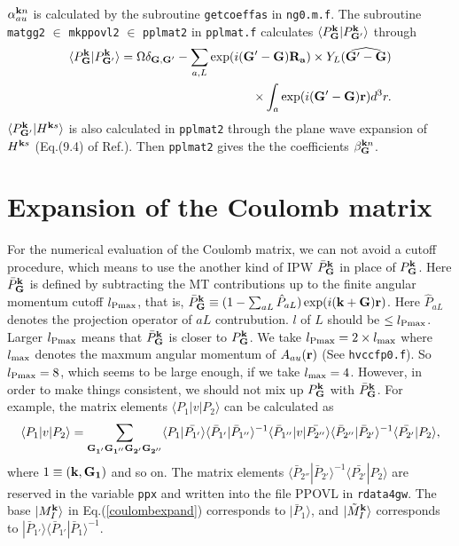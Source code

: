 \documentclass[a4paper,10pt,epsf,fleqn]{article}
\begin{document}
{\noindent $\alpha^{{\bf k} n}_{au}$ is calculated by the subroutine {\tt getcoeffas} in 
{\tt ng0.m.f}.
The subroutine {\tt matgg2} $\in$ {\tt mkppovl2} $\in$ {\tt pplmat2} in {\tt pplmat.f} calculates
$\langle P^{\bf k}_{\bf G}|P^{\bf k}_{{\bf G}'} \rangle$ through
\begin{eqnarray}
\langle P^{\bf k}_{\bf G}|P^{\bf k}_{{\bf G}'} \rangle
= \Omega \delta_{{\bf G},{\bf G}'} -  
\sum_{a,L} \exp( i ({\bf G}'-{\bf G}) {\bf R_a}) 
\times Y_L(\widehat{{\bf G}'-{\bf G}}) \nonumber \\
\times \int_{a} \exp(i({\bf G}'-{\bf G}){\bf r}) d^3r.
\end{eqnarray}
$\langle P^{\bf k}_{{\bf G}'}| H^{{\bf k}s} \rangle$ is also calculated
in {\tt pplmat2} through the plane wave expansion of $H^{{\bf k}s}$
(Eq.(9.4) of Ref.\cite{bott98}). Then {\tt pplmat2} gives the
the coefficients $\beta^{{\bf k}n}_{\bf G}$.

\section{Expansion of the Coulomb matrix}
For the numerical evaluation of the Coulomb matrix,
we can not avoid a cutoff procedure, which means to use
the another kind of IPW $\bar{P}^{\bf k}_{{\bf G}}$
in place of $P^{\bf k}_{{\bf G}}$.
Here $\bar{P}^{\bf k}_{{\bf G}}$ is defined by subtracting
the MT contributions up to the finite angular momentum cutoff $l_{\rm Pmax}$,
that is, $\bar{P}^{\bf k}_{{\bf G}} \equiv 
( 1- \sum_{aL} \hat{P}_{aL} ) \exp(i ({\bf k+ G}){\bf r}) $.
Here $\hat{P}_{aL}$ denotes the projection operator of ${aL}$ contrubution.
$l$ of $L$ should be $\le l_{\rm Pmax}$.
Larger $l_{\rm Pmax}$ means that
$\bar{P}^{\bf k}_{{\bf G}}$ is closer to ${P}^{\bf k}_{{\bf G}}$.
We take $l_{\rm Pmax} = 2 \times l_{\rm max}$ where $l_{\rm max}$
denotes the maxmum angular momentum of $A_{au}({\bf r})$ 
(See {\tt hvccfp0.f}). So $l_{\rm Pmax}=8$, which seems to be large enough, 
if we take $l_{\rm max}=4$. However, in order to make things consistent,
we should not mix up $P^{\bf k}_{{\bf G}}$ 
with $\bar{P}^{\bf k}_{{\bf G}}$.
For example, the matrix elements $\langle P_1 |v| P_2 \rangle$ 
can be calculated as
\begin{eqnarray}
\langle P_1 |v| P_2 \rangle = \sum_{\bf G_{1'} G_{1''} G_{2'} G_{2''}} 
\langle P_1 | \bar{P_{1'}} \rangle  
\langle \bar{P}_{1'}| \bar{P}_{1''} \rangle^{-1} 
\langle \bar{P}_{1''} |v| \bar{P_{2''}} \rangle  
\langle \bar{P}_{2''}| \bar{P}_{2'} \rangle^{-1} 
\langle \bar{P_{2'}} | P_2 \rangle,  
\end{eqnarray}
where $1\equiv ({\bf k},{\bf G_1})$ and so on.
The matrix elements
$\langle \bar{P}_{2''}| \bar{P}_{2'} \rangle^{-1} 
\langle \bar{P_{2'}} | P_2 \rangle$
are reserved in the variable {\tt ppx} and written into the file
{\sf PPOVL} in {\tt rdata4gw}.
The base $|M^{\bf k}_I \rangle$ in Eq.(\ref{coulombexpand}) corresponds to $|\bar{P}_1 \rangle$,
and $|\tilde{M}^{\bf k}_I \rangle$ corresponds to
$| \bar{P}_{1'} \rangle \langle \bar{P}_{1'}| \bar{P}_{1} \rangle^{-1}$.


}
\end{document}
